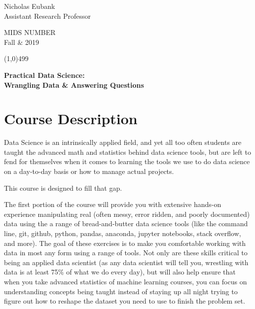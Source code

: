 \documentclass[12pt]{article}
\begin{document}
\singlespacing






\thispagestyle{empty}
\begin{minipage}[t]{.5\textwidth}
	Nicholas Eubank \\
	 Assistant Research Professor\\
     \vspace*{0.1cm}
\end{minipage}
\begin{minipage}[t]{.5\textwidth}
	\begin{flushright}  MIDS NUMBER\\
	Fall \& 2019\\
    \vspace*{0.1cm}
\end{flushright}
\end{minipage}


\line(1,0){499}

\vspace{.35in}

\begin{center}
	\textbf{\LARGE{Practical Data Science:} }\\
	\vspace*{.05in}
	\textbf{\large{Wrangling Data \& Answering Questions }}
\end{center}








\section{Course Description}

Data Science is an intrinsically applied field, and yet all too often students are taught the advanced math and statistics behind data science tools, but are left to fend for themselves when it comes to learning the tools we use to do data science on a day-to-day basis or how to manage actual projects.

This course is designed to fill that gap.

The first portion of the course will provide you with extensive hands-on experience manipulating real (often messy, error ridden, and poorly documented) data using the a range of bread-and-butter data science tools (like the command line, git, github, python, pandas, anaconda, jupyter notebooks, stack overflow, and more). The goal of these exercises is to make you comfortable working with data in most any form using a range of tools. Not only are these skills critical to being an applied data scientist (as any data scientist will tell you, wrestling with data is at least 75\% of what we do every day), but will also help ensure that when you take advanced statistics of machine learning courses, you can focus on understanding concepts being taught instead of staying up all night trying to figure out how to reshape the dataset you need to use to finish the problem set.
\end{document}
